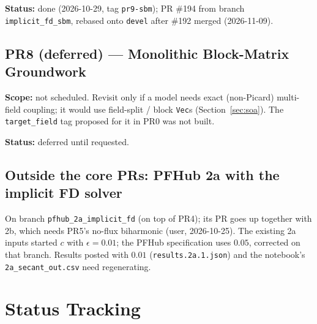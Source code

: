 \documentclass[11pt]{article}
\newcommand{\pr}[2]{\subsection{PR#1 --- #2}}
\newcommand{\status}[1]{\textcolor{marlinteal}{\textbf{Status:}} #1}
\begin{document}
\status{done (2026-10-29, tag \texttt{pr9-sbm}); PR \#194 from branch \texttt{implicit\_fd\_sbm},
rebased onto \texttt{devel} after \#192 merged (2026-11-09).}

\pr{8 (deferred)}{Monolithic Block-Matrix Groundwork}
\textbf{Scope:} not scheduled. Revisit only if a model needs exact
(non-Picard) multi-field coupling; it would use field-split / block
\texttt{Vec}s (Section~\ref{sec:soa}). The \texttt{target\_field} tag
proposed for it in PR0 was not built.

\status{deferred until requested.}

\subsection*{Outside the core PRs: PFHub 2a with the implicit FD solver}
On branch \texttt{pfhub\_2a\_implicit\_fd} (on top of PR4); its PR goes up
together with 2b, which needs PR5's no-flux biharmonic (user, 2026-10-25). The existing 2a inputs started $c$
with $\epsilon = 0.01$; the PFHub specification uses $0.05$, corrected on
that branch. Results posted with $0.01$ (\texttt{results.2a.1.json}) and the
notebook's \texttt{2a\_secant\_out.csv} need regenerating.

\section{Status Tracking}
\end{document}
